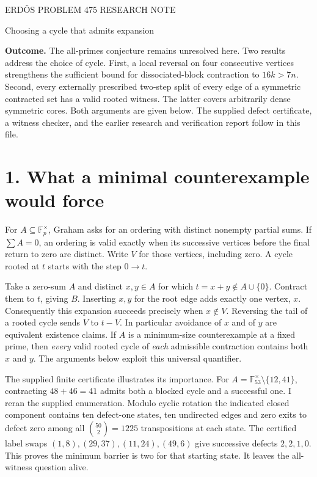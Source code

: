 \documentclass[11pt]{article}
\newcommand{\F}{\mathbb F_p}
\begin{document}
{\small ERD\H OS PROBLEM 475 \hfill RESEARCH NOTE}\par
{\LARGE Choosing a cycle that admits expansion}\par
\textbf{Outcome.} The all-primes conjecture remains unresolved here. Two results address the choice of cycle. First, a local reversal on four consecutive vertices strengthens the sufficient bound for dissociated-block contraction to $16k>7n$. Second, every externally prescribed two-step split of every edge of a symmetric contracted set has a valid rooted witness. The latter covers arbitrarily dense symmetric cores. Both arguments are given below. The supplied defect certificate, a witness checker, and the earlier research and verification report follow in this file.

\section*{1. What a minimal counterexample would force}
For $A\subseteq\F^\times$, Graham asks for an ordering with distinct nonempty partial sums. If $\sum A=0$, an ordering is valid exactly when its successive vertices before the final return to zero are distinct. Write $V$ for those vertices, including zero. A cycle rooted at $t$ starts with the step $0\to t$.

Take a zero-sum $A$ and distinct $x,y\in A$ for which $t=x+y\notin A\cup\{0\}$. Contract them to $t$, giving $B$. Inserting $x,y$ for the root edge adds exactly one vertex, $x$. Consequently this expansion succeeds precisely when $x\notin V$. Reversing the tail of a rooted cycle sends $V$ to $t-V$. In particular avoidance of $x$ and of $y$ are equivalent existence claims. If $A$ is a minimum-size counterexample at a fixed prime, then \emph{every} valid rooted cycle of \emph{each} admissible contraction contains both $x$ and $y$. The arguments below exploit this universal quantifier.

The supplied finite certificate illustrates its importance. For $A=\mathbb F_{53}^{\times}\setminus\{12,41\}$, contracting $48+46=41$ admits both a blocked cycle and a successful one. I reran the supplied enumeration. Modulo cyclic rotation the indicated closed component contains ten defect-one states, ten undirected edges and zero exits to defect zero among all $\binom{50}{2}=1225$ transpositions at each state. The certified label swaps $(1,8),(29,37),(11,24),(49,6)$ give successive defects $2,2,1,0$. This proves the minimum barrier is two for that starting state. It leaves the all-witness question alive.
\end{document}

